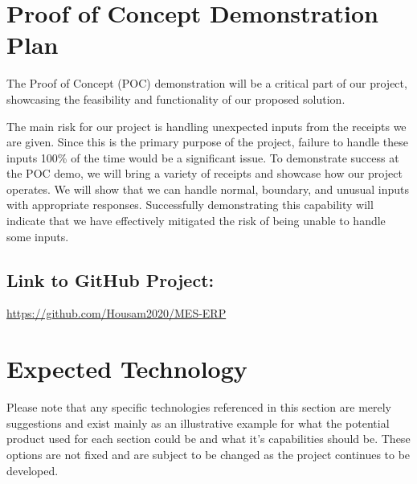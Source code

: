 \documentclass{article}
\begin{document}
\section{Proof of Concept Demonstration Plan}

\vspace{0.5cm}

The Proof of Concept (POC) demonstration will be a critical part of our project, showcasing the feasibility and functionality of our proposed solution.

The main risk for our project is handling unexpected inputs from the receipts we are given. Since this is the primary purpose of the project, failure to handle these inputs 100\% of the time would be a significant issue. To demonstrate success at the POC demo, we will bring a variety of receipts and showcase how our project operates. We will show that we can handle normal, boundary, and unusual inputs with appropriate responses. Successfully demonstrating this capability will indicate that we have effectively mitigated the risk of being unable to handle some inputs.

\subsection{Link to GitHub Project:} \href{https://github.com/Housam2020/MES-ERP}{https://github.com/Housam2020/MES-ERP} \\
\section{Expected Technology}

Please note that any specific technologies referenced in this section are merely suggestions and exist mainly as an illustrative example for what the potential product used for each section could be and what it's capabilities should be. These options are not fixed and are subject to be changed as the project continues to be developed.
\end{document}
